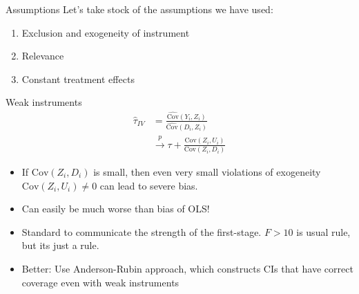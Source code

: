 \documentclass[xcolor=dvipsnames]{beamer}
\newcommand{\inprob}{\stackrel{p}{\rightarrow}}
\begin{document}
\begin{frame}{Assumptions}
 Let's take stock of the assumptions we have used: \\
\medskip
\begin{enumerate}
\item Exclusion and exogeneity of instrument
\medskip
\item Relevance
\medskip
\item Constant treatment effects
\end{enumerate}
\end{frame}

\begin{frame}{Weak instruments}
\small
\begin{align*}
 \widehat{\tau}_{IV} &=  \frac{\widehat{\text{Cov}}(Y_i, Z_i)}{\widehat{\text{Cov}}(D_i, Z_i)}\\
 &\inprob \tau + \frac{\text{Cov}(Z_i, U_i)}{\text{Cov}(Z_i,D_i)}
 \end{align*}
 
 \small
\begin{itemize}[<+->]
\item
  If \(\text{Cov}(Z_i, D_i)\) is small, then even very small violations
  of exogeneity \(\text{Cov}(Z_i,U_i) \neq 0\) can lead
  to severe bias.
  \smallskip
\item Can easily be much worse than bias of OLS!
\smallskip
\item  Standard to communicate the strength of the first-stage. $F>10$ is usual rule, but its just a rule.
\smallskip
\item Better: Use Anderson-Rubin approach, which constructs CIs that have correct coverage even with weak instruments
\end{itemize}

\end{frame}

\end{document}
